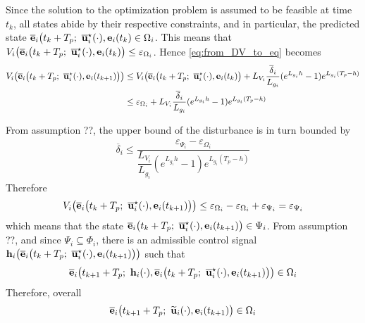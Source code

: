 \begin{gg_box}
Since the solution to the optimization problem is assumed to be feasible
at time $t_k$, all states abide by their respective constraints, and in
particular, the predicted state
$\overline{\bm{\mathbf{e}}}_i\big(t_k + T_p;\ \overline{\bm{\mathbf{u}}}_i^{\star}(\cdot), \bm{\mathbf{e}}_i(t_k) \in \Omega_i$.
This means that
$V_i\big(\overline{\vect{e}}_i\big(t_k + T_p;\ \overline{\vect{u}}_i^{\star}(\cdot), \vect{e}_i(t_k)\big) \leq \varepsilon_{\Omega_i}$.
Hence \eqref{eq:from_DV_to_eq} becomes
\begin{align}
  V_i\big(\overline{\vect{e}}_i\big(t_k + T_p;\ \overline{\vect{u}}_i^{\star}(\cdot), \vect{e}_i(t_{k+1})\big)\big)
  &\leq V_i\big(\overline{\vect{e}}_i\big(t_k + T_p;\ \overline{\vect{u}}_i^{\star}(\cdot), \vect{e}_i(t_k)\big) + L_{V_i} \dfrac{\overline{\delta}_i}{L_{g_i}} (e^{L_{g_i}h} - 1) e^{L_{g_i} (T_p - h)} \\
  &\leq \varepsilon_{\Omega_i} + L_{V_i} \dfrac{\overline{\delta}_i}{L_{g_i}} (e^{L_{g_i}h} - 1) e^{L_{g_i} (T_p - h)}
\label{eq:from_DV_to_eq_2}
\end{align}

From assumption ??, the upper bound of the disturbance is in turn bounded by
\begin{align}
  \overline{\delta}_i \leq \dfrac{\varepsilon_{\Psi_i} - \varepsilon_{\Omega_i}}{\dfrac{L_{V_i}}{L_{g_i}} (e^{L_{g_i}h} - 1) e^{L_{g_i} (T_p - h)}}
\end{align}
Therefore
\begin{align}
  V_i\big(\overline{\vect{e}}_i\big(t_k + T_p;\ \overline{\vect{u}}_i^{\star}(\cdot), \vect{e}_i(t_{k+1})\big)\big)
  \leq  \varepsilon_{\Omega_i} - \varepsilon_{\Omega_i} + \varepsilon_{\Psi_i} = \varepsilon_{\Psi_i}
\end{align}
which means that the state
$\overline{\vect{e}}_i\big(t_k + T_p;\ \overline{\vect{u}}_i^{\star}(\cdot), \vect{e}_i(t_{k+1})\big) \in \Psi_i$.
From assumption ??, and since $\Psi_i \subseteq \Phi_i$, there is an
admissible control signal $\bm{\mathbf{h}}_i\big(\overline{\bm{\mathbf{e}}}_i\big(t_k + T_p;\ \overline{\bm{\mathbf{u}}}_i^{\star}(\cdot), \bm{\mathbf{e}}_i(t_{k+1})\big)\big)$
such that
\begin{align}
  \overline{\vect{e}}_i\big(t_{k+1} + T_p;\ \vect{h}_i(\cdot), \overline{\vect{e}}_i\big(t_k + T_p;\ \overline{\vect{u}}_i^{\star}(\cdot), \vect{e}_i(t_{k+1})\big)\big) \in \Omega_i
\end{align}
Therefore, overall
\begin{align}
  \overline{\vect{e}}_i\big(t_{k+1} + T_p;\ \widetilde{\vect{u}}_i(\cdot), \vect{e}_i(t_{k+1}) \big) \in \Omega_i
\end{align}
\qedsymbol
\end{gg_box}

